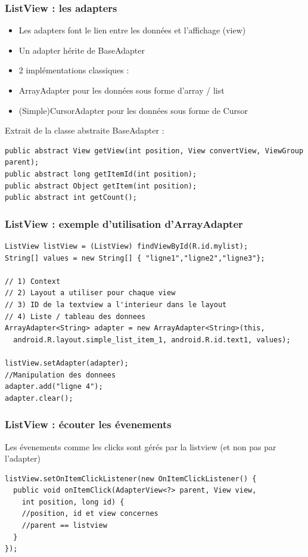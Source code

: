 \documentclass{beamer}
\begin{document}
\begin{frame}[fragile]
\frametitle{ListView : les adapters}
\begin{itemize}
  \item Les adapters font le lien entre les données et l'affichage (view) 
  \item Un adapter hérite de BaseAdapter
  \item 2 implémentations classiques : 
  \item ArrayAdapter pour les données sous forme d'array / list
  \item (Simple)CursorAdapter pour les données sous forme de Cursor
\end{itemize}
Extrait de la classe abstraite BaseAdapter :
\begin{lstlisting}
public abstract View getView(int position, View convertView, ViewGroup parent);
public abstract long getItemId(int position);
public abstract Object getItem(int position);
public abstract int getCount();
\end{lstlisting}
\end{frame}
\begin{frame}[fragile]
\frametitle{ListView : exemple d'utilisation d'ArrayAdapter}
\begin{lstlisting}
ListView listView = (ListView) findViewById(R.id.mylist);
String[] values = new String[] { "ligne1","ligne2","ligne3"};

// 1) Context
// 2) Layout a utiliser pour chaque view
// 3) ID de la textview a l'interieur dans le layout
// 4) Liste / tableau des donnees
ArrayAdapter<String> adapter = new ArrayAdapter<String>(this,
  android.R.layout.simple_list_item_1, android.R.id.text1, values);

listView.setAdapter(adapter); 
//Manipulation des donnees
adapter.add("ligne 4");
adapter.clear();
\end{lstlisting}
\end{frame}
\begin{frame}[fragile]
\frametitle{ListView : écouter les évenements}
Les évenements comme les clicks sont gérés par la listview (et non pas par l'adapter)
\begin{lstlisting}
listView.setOnItemClickListener(new OnItemClickListener() {
  public void onItemClick(AdapterView<?> parent, View view,
    int position, long id) {
    //position, id et view concernes 
    //parent == listview
  }
});
\end{lstlisting}
\end{frame}
\end{document}
